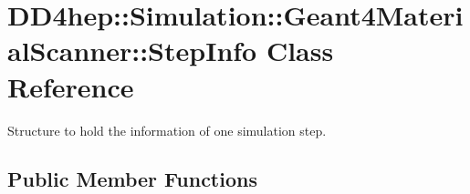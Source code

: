 \hypertarget{class_d_d4hep_1_1_simulation_1_1_geant4_material_scanner_1_1_step_info}{}\section{D\+D4hep\+:\+:Simulation\+:\+:Geant4\+Material\+Scanner\+:\+:Step\+Info Class Reference}
\label{class_d_d4hep_1_1_simulation_1_1_geant4_material_scanner_1_1_step_info}


Structure to hold the information of one simulation step.  


\subsection*{Public Member Functions}

